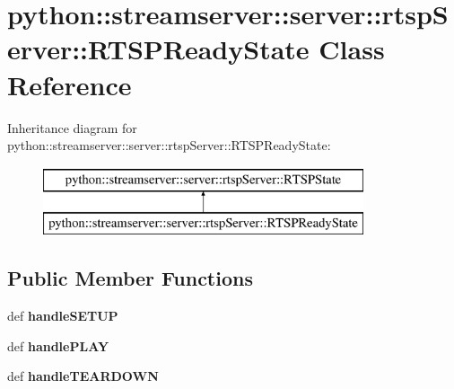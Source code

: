 \hypertarget{classpython_1_1streamserver_1_1server_1_1rtspServer_1_1RTSPReadyState}{
\section{python::streamserver::server::rtspServer::RTSPReadyState Class Reference}
\label{classpython_1_1streamserver_1_1server_1_1rtspServer_1_1RTSPReadyState}
}
Inheritance diagram for python::streamserver::server::rtspServer::RTSPReadyState:\begin{figure}[H]
\begin{center}
\leavevmode
\includegraphics[height=2.000000cm]{classpython_1_1streamserver_1_1server_1_1rtspServer_1_1RTSPReadyState}
\end{center}
\end{figure}
\subsection*{Public Member Functions}
\begin{DoxyCompactItemize}
\item 
\hypertarget{classpython_1_1streamserver_1_1server_1_1rtspServer_1_1RTSPReadyState_a81962d804179d9b796b820644a27b5c8}{
def {\bfseries handleSETUP}}
\label{classpython_1_1streamserver_1_1server_1_1rtspServer_1_1RTSPReadyState_a81962d804179d9b796b820644a27b5c8}

\item 
\hypertarget{classpython_1_1streamserver_1_1server_1_1rtspServer_1_1RTSPReadyState_ad013997941e8969f410b550318c683c8}{
def {\bfseries handlePLAY}}
\label{classpython_1_1streamserver_1_1server_1_1rtspServer_1_1RTSPReadyState_ad013997941e8969f410b550318c683c8}

\item 
\hypertarget{classpython_1_1streamserver_1_1server_1_1rtspServer_1_1RTSPReadyState_a1a1c6914b0b6d949b7f55cfdd636fccc}{
def {\bfseries handleTEARDOWN}}
\label{classpython_1_1streamserver_1_1server_1_1rtspServer_1_1RTSPReadyState_a1a1c6914b0b6d949b7f55cfdd636fccc}

\end{DoxyCompactItemize}


